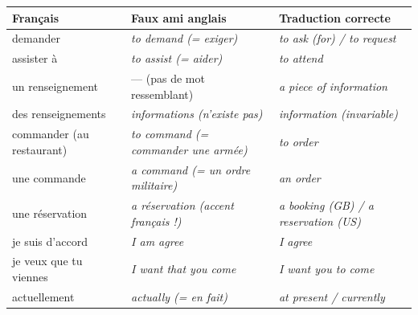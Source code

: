 \documentclass[11pt]{article}
\newcommand{\eng}[1]{\ifmmode\text{\textit{#1}}\else\begingroup\selectlanguage{english}\itshape #1\endgroup\fi}
\begin{document}
\begin{center}
\begin{tabularx}{\linewidth}{|X|X|X|}
\hline
\rowcolor{popblueL} Français & Faux ami anglais & Traduction correcte \\
\hline
demander & \eng{to demand} (= exiger) & \eng{to ask (for)} / \eng{to request} \\
\hline
assister à & \eng{to assist} (= aider) & \eng{to attend} \\
\hline
un renseignement & — (pas de mot ressemblant) & \eng{a piece of information} \\
\hline
des renseignements & \eng{informations} (n'existe pas) & \eng{information} (invariable) \\
\hline
commander (au restaurant) & \eng{to command} (= commander une armée) & \eng{to order} \\
\hline
une commande & \eng{a command} (= un ordre militaire) & \eng{an order} \\
\hline
une réservation & \eng{a réservation} (accent français !) & \eng{a booking} (GB) / \eng{a reservation} (US) \\
\hline
je suis d'accord & \eng{I am agree} & \eng{I agree} \\
\hline
je veux que tu viennes & \eng{I want that you come} & \eng{I want you to come} \\
\hline
actuellement & \eng{actually} (= en fait) & \eng{at present} / \eng{currently} \\
\hline
\end{tabularx}
\end{center}
\end{document}
